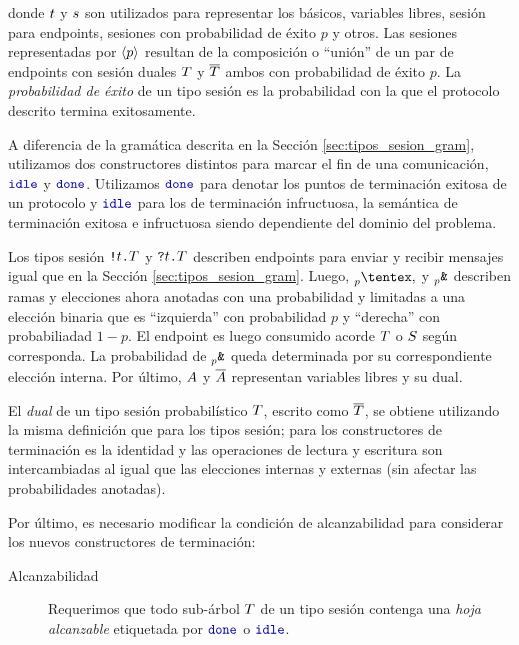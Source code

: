 donde $t$ y $s$ son utilizados para representar los  básicos,
variables libres, sesión para endpoints, sesiones con probabilidad de
éxito $p$ y otros. Las sesiones representadas por $\langle p \rangle$ resultan
de la composición o ``unión'' de un par de endpoints con sesión duales
$T$ y $\overline{T}$ ambos con probabilidad de éxito $p$. La
\emph{probabilidad de éxito} de un tipo sesión es la probabilidad con la que
el protocolo descrito termina exitosamente.

A diferencia de la gramática descrita en la Sección \ref{sec:tipos_sesion_gram},
utilizamos dos constructores distintos para marcar el fin de una comunicación,
$\Idle$ y $\Done$. Utilizamos $\Done$ para denotar los puntos de terminación
exitosa de un protocolo y $\Idle$ para los de terminación infructuosa, la
semántica de terminación exitosa e infructuosa siendo dependiente del dominio
del problema.

Los tipos sesión ${\texttt{\upshape!}}{t}\texttt{\upshape.}T$ y ${\texttt{\upshape?}}{t}\texttt{\upshape.}T$ describen
endpoints para enviar y recibir mensajes igual que en la Sección
\ref{sec:tipos_sesion_gram}. Luego, $\PChoice$ y $\PBranch$ describen ramas y
elecciones  ahora anotadas con una probabilidad y limitadas a una elección
binaria que es ``izquierda'' con probabilidad $p$ y ``derecha'' con
probabiliadad $1 - p$. El endpoint es luego consumido acorde $T$ o
$S$ según corresponda. La probabilidad de $\PBranch$ queda
determinada por su correspondiente elección interna. Por último, $A$ y
$\overline{A}$ representan variables libres y su dual.

El \emph{dual} de un tipo sesión probabilístico $T$, escrito como
$\overline{T}$, se obtiene utilizando la misma definición que para los
tipos sesión; para los constructores de terminación es la identidad y las
operaciones de lectura y escritura son intercambiadas al igual que las
elecciones internas y externas (sin afectar las probabilidades anotadas).

Por último, es necesario modificar la condición de alcanzabilidad para
considerar los nuevos constructores de terminación:
\begin{description}
	\item[Alcanzabilidad] Requerimos que todo sub-árbol $T$ de un
		tipo sesión contenga una \emph{hoja alcanzable} etiquetada por $\Done$ o
		$\Idle$.
\end{description}

